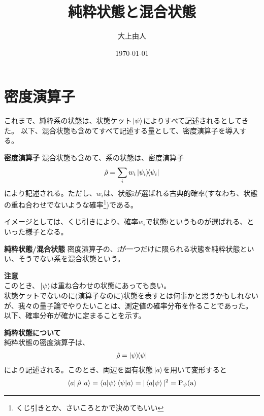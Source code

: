 \documentclass[a4paper,11pt]{jsarticle}
\begin{document}
\title{純粋状態と混合状態}
\author{大上由人}
\date{\today}
\maketitle
\section[1]{密度演算子}
これまで、純粋系の状態は、状態ケット$\ket*{\psi}$によりすべて記述されるとしてきた。
以下、混合状態も含めてすべて記述する量として、密度演算子を導入する。\\

\begin{itembox}[l]{\textbf {密度演算子}}
   混合状態も含めて、系の状態は、密度演算子
    \begin{align}
        \hat{\rho} = \sum_{i} w_i\ketbra*{\psi_i}
    \end{align}
    により記述される。ただし、$w_i$は、状態iが選ばれる古典的確率(すなわち、状態の重ね合わせでないような確率\footnote{くじ引きとか、さいころとかで決めてもいい})である。
    \end{itembox}
イメージとしては、くじ引きにより、確率$w_i$で状態iというものが選ばれる、といった様子となる。\\

\begin{itembox}[l]{\textbf{純粋状態/混合状態}}
    密度演算子の、iが一つだけに限られる状態を純粋状態といい、そうでない系を混合状態という。
\end{itembox}
\textbf{注意}\\
このとき、$\ket*{\psi}$は重ね合わせの状態にあっても良い。\\

状態ケットでないのに(演算子なのに)状態を表すとは何事かと思うかもしれないが、我々の量子論でやりたいことは、測定値の確率分布を作ることであった。
以下、確率分布が確かに定まることを示す。

\textbf{純粋状態について}\\
純粋状態の密度演算子は、
\begin{align}
    \hat{\rho} = \ketbra{\psi}
\end{align}
により記述される。このとき、両辺を固有状態$\ket*{a}$を用いて変形すると\\
\begin{align}
    \bra{a}\hat{\rho}\ket*{a} =\braket{a}{\psi}\braket{\psi}{a}
    =|\braket{a}{\psi}|^2
    =\mathrm{P_{\psi}(a)}
\end{align}
\end{document}
